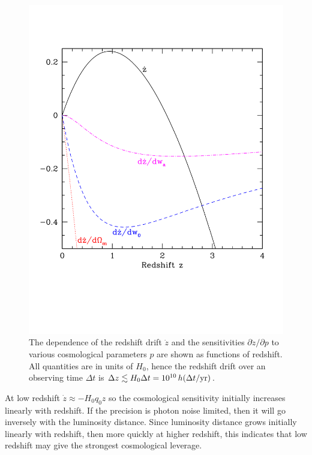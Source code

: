 \documentclass[preprint]{aastex}
\begin{document}
\begin{figure}
   \centering
   \includegraphics[width=\columnwidth]{zdriftd.pdf}
\caption{The dependence of the redshift drift $\dot z$ and the sensitivities 
$\partial\dot z/\partial p$ to various cosmological parameters $p$ are shown 
as functions of redshift. All quantities are in units of $H_0$, hence 
the redshift drift over an observing time $\Delta t$ is 
$\Delta z\lesssim H_0\Delta t=10^{10}\,h(\Delta t/{\rm yr})$. 
}
\label{fig:sens} 
\end{figure}


At low redshift $\dot z\approx -H_0q_0z$ so the cosmological sensitivity 
initially increases linearly with redshift. If the precision is photon 
noise limited, then it will go inversely with the luminosity distance. 
Since luminosity distance grows initially linearly with redshift, then 
more quickly at higher redshift, this indicates that low redshift may give 
the strongest cosmological leverage. 
\end{document}
